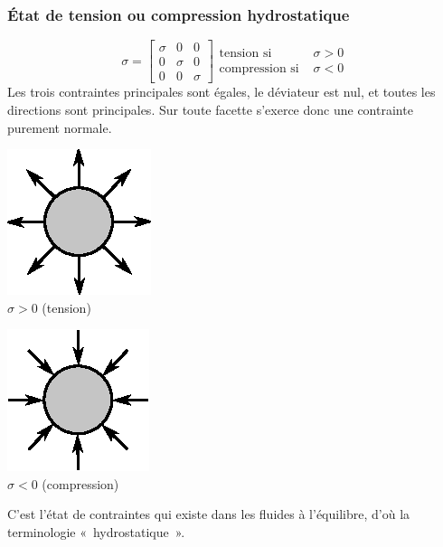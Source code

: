 \subsubsection{État de tension ou compression hydrostatique}
\begin{equation}
    \mathbb{\sigma} = 
    \begin{bmatrix}
        \sigma & 0 & 0 \\
        0 & \sigma & 0 \\
        0 & 0 & \sigma
    \end{bmatrix}
    \begin{aligned}
        \text{tension si } & \sigma > 0\\
        \text{compression si } & \sigma < 0
    \end{aligned}
    \label{eq:Ch02-017}
\end{equation}
Les trois contraintes principales sont égales, le déviateur est nul, et toutes les directions sont principales.
Sur toute facette s'exerce donc une contrainte purement normale.
\begin{multicols}{2}
    \begin{center}
        \includegraphics{../images/T1_Ch02-0006a}\\
        $\sigma > 0$ (tension)
    \end{center}
    \columnbreak
    \begin{center}
        \includegraphics{../images/T1_Ch02-0006b}\\
        $\sigma < 0$ (compression)
    \end{center}
\end{multicols}
C'est l'état de contraintes qui existe dans les fluides à l'équilibre, d'où la terminologie «~hydrostatique~».
